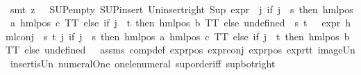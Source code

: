 \begin{isabellebody}
\ {\isasymphi}\ \ \isanewline
\ \ \ \ \ \ \isamarkupfalse%
\ {\isacharparenleft}{\kern0pt}smt\ {\isacharparenleft}{\kern0pt}z{}{\isacharparenright}{\kern0pt}\ {\isachardoublequoteopen}{}{\isachardoublequoteclose}\ {\isachardoublequoteopen}{}{\isachardoublequoteclose}\ SUP{\isacharunderscore}{\kern0pt}empty\ SUP{\isacharunderscore}{\kern0pt}insert\ Un{\isacharunderscore}{\kern0pt}insert{\isacharunderscore}{\kern0pt}right\ {\isacartoucheopen}Sup\ {\isacharparenleft}{\kern0pt}{\isacharparenleft}{\kern0pt}expr{\isacharunderscore}{\kern0pt}{}\ {\isasymcirc}\ {\isacharparenleft}{\kern0pt}{\isasymlambda}j{\isachardot}{\kern0pt}\ if\ j\ {\isacharequal}{\kern0pt}\ s\ then\ hml{\isacharunderscore}{\kern0pt}pos\ a\ {\isacharparenleft}{\kern0pt}hml{\isacharunderscore}{\kern0pt}pos\ c\ TT{\isacharparenright}{\kern0pt}\ else\ if\ j\ {\isacharequal}{\kern0pt}\ t\ then\ hml{\isacharunderscore}{\kern0pt}pos\ b\ TT\ else\ undefined{\isacharparenright}{\kern0pt}{\isacharparenright}{\kern0pt}\ {\isacharbackquote}{\kern0pt}\ {\isacharbraceleft}{\kern0pt}s{\isacharcomma}{\kern0pt}\ t{\isacharbraceright}{\kern0pt}{\isacharparenright}{\kern0pt}\ {\isacharequal}{\kern0pt}\ {}{\isacartoucheclose}\ {\isacartoucheopen}expr{\isacharunderscore}{\kern0pt}{}\ {\isacharparenleft}{\kern0pt}hml{\isacharunderscore}{\kern0pt}conj\ {\isacharbraceleft}{\kern0pt}{\isacharbraceright}{\kern0pt}\ {\isacharbraceleft}{\kern0pt}s{\isacharcomma}{\kern0pt}\ t{\isacharbraceright}{\kern0pt}\ {\isacharparenleft}{\kern0pt}{\isasymlambda}j{\isachardot}{\kern0pt}\ if\ j\ {\isacharequal}{\kern0pt}\ s\ then\ hml{\isacharunderscore}{\kern0pt}pos\ a\ {\isacharparenleft}{\kern0pt}hml{\isacharunderscore}{\kern0pt}pos\ c\ TT{\isacharparenright}{\kern0pt}\ else\ if\ j\ {\isacharequal}{\kern0pt}\ t\ then\ hml{\isacharunderscore}{\kern0pt}pos\ b\ TT\ else\ undefined{\isacharparenright}{\kern0pt}{\isacharparenright}{\kern0pt}\ {\isacharequal}{\kern0pt}\ {}{\isacartoucheclose}\ assms{\isacharparenleft}{\kern0pt}{}{\isacharparenright}{\kern0pt}\ comp{\isacharunderscore}{\kern0pt}def\ expr{\isacharunderscore}{\kern0pt}{}{\isacharunderscore}{\kern0pt}pos\ expr{\isacharunderscore}{\kern0pt}{}{\isacharunderscore}{\kern0pt}conj\ expr{\isacharunderscore}{\kern0pt}{}{\isacharunderscore}{\kern0pt}pos\ expr{\isacharunderscore}{\kern0pt}{}{\isacharunderscore}{\kern0pt}tt\ image{\isacharunderscore}{\kern0pt}Un\ insert{\isacharunderscore}{\kern0pt}is{\isacharunderscore}{\kern0pt}Un\ numeral{\isacharunderscore}{\kern0pt}One\ one{\isacharunderscore}{\kern0pt}le{\isacharunderscore}{\kern0pt}numeral\ sup{\isachardot}{\kern0pt}order{\isacharunderscore}{\kern0pt}iff\ sup{\isacharunderscore}{\kern0pt}bot{\isacharunderscore}{\kern0pt}right{\isacharparenright}{\kern0pt}\isanewline

\end{isabellebody}

